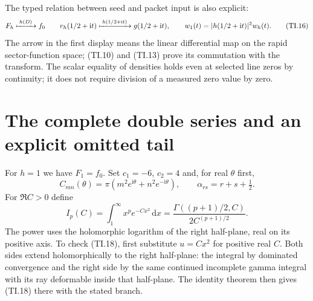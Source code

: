 \documentclass[11pt]{article}
\newcommand{\ii}{\mathrm i}
\newcommand{\dd}{\,\mathrm d}
\begin{document}
The typed relation between seed and packet input is also explicit:
\begin{equation}
 F_h\xmapsto{\;h(D)\;}f_0
 \qquad
 v_h(1/2+\ii t)\xmapsto{\;h(1/2+\ii t)\;}
 g(1/2+\ii t),\qquad
 w_1(t)=|h(1/2+\ii t)|^2w_h(t). \tag{TI.16}
\end{equation}
The arrow in the first display means the linear differential map on
the rapid sector-function space; (TI.10) and (TI.13) prove its
commutation with the transform. The scalar equality of densities
holds even at selected line zeros by continuity; it does not require
division of a measured zero value by zero.

\section{The complete double series and an explicit omitted tail}

For $h=1$ we have $F_1=f_0$. Set $c_1=-6$, $c_2=4$ and, for real
$\theta$ first,
\begin{equation}
 C_{mn}(\theta)=\pi(m^2e^{\ii\theta}+n^2e^{-\ii\theta}),\qquad
 \alpha_{rs}=r+s+\tfrac12. \tag{TI.17}
\end{equation}
For $\Re C>0$ define
\begin{equation}
 I_p(C)=\int_1^\infty x^p e^{-Cx^2}\dd x
 =\frac{\Gamma((p+1)/2,C)}{2C^{(p+1)/2}}. \tag{TI.18}
\end{equation}
The power uses the holomorphic logarithm of the right half-plane,
real on its positive axis. To check (TI.18), first substitute $u=Cx^2$
for positive real $C$. Both sides extend holomorphically to the right
half-plane: the integral by dominated convergence and the right side
by the same continued incomplete gamma integral with its ray deformable
inside that half-plane. The identity theorem then gives (TI.18)
there with the stated branch.
\end{document}
